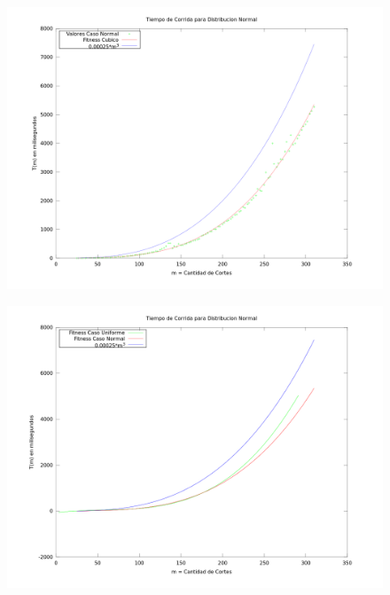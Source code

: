 \begin{figure}[h]
\centering                                                       
        \includegraphics[width=320pt]{./figs/Ej3DN.png}
	\label{fig:ej3DN}
\end{figure}

\begin{figure}[h]
\centering                                                       
        \includegraphics[width=320pt]{./figs/Ej3CompDUDN.png}
	\label{fig:ej3DUDN}
\end{figure}

\newpage

